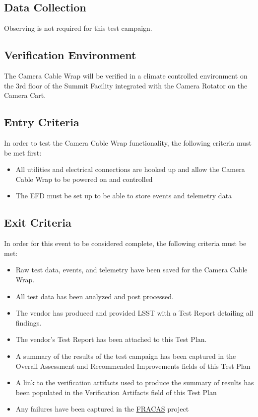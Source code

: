 \documentclass[SE,lsstdraft,STR,toc]{lsstdoc}
\providecommand{\tightlist}{
  \setlength{\itemsep}{0pt}\setlength{\parskip}{0pt}}
\begin{document}
\subsection{Data Collection}

  Observing is not required for this test campaign.

\subsection{Verification Environment}
\label{sect:hwconf}
  The Camera Cable Wrap will be verified in a climate controlled
environment on the 3rd floor of the Summit Facility integrated with the
Camera Rotator on the Camera Cart.


  \subsection{Entry Criteria}
  In order to test the Camera Cable Wrap functionality, the following
criteria must be met first:

\begin{itemize}
\tightlist
\item
  All utilities and electrical connections are hooked up and allow the
  Camera Cable Wrap to be powered on and controlled
\item
  The EFD must be set up to be able to store events and telemetry data
\end{itemize}


  \subsection{Exit Criteria}
  In order for this event to be considered complete, the following
criteria must be met:

\begin{itemize}
\tightlist
\item
  Raw test data, events, and telemetry have been saved for the Camera
  Cable Wrap.
\item
  All test data has been analyzed and post processed.
\item
  The vendor has produced and provided LSST with a Test Report detailing
  all findings.
\item
  The vendor's Test Report has been attached to this Test Plan.
\item
  A summary of the results of the test campaign has been captured in the
  Overall Assessment and Recommended Improvements fields of this Test
  Plan
\item
  A link to the verification artifacts used to produce the summary of
  results has been populated in the Verification Artifacts field of this
  Test Plan
\item
  Any failures have been captured in the
  \href{https://jira.lsstcorp.org/projects/FRACAS/issues/}{FRACAS}
  project
\end{itemize}
\end{document}
